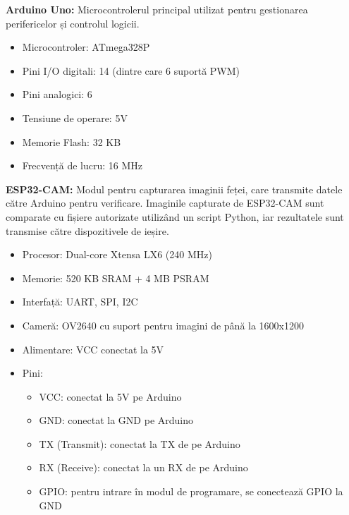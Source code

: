 \documentclass[a4paper,12pt]{report}
\begin{document}
\textbf{Arduino Uno:} Microcontrolerul principal utilizat pentru gestionarea perifericelor și controlul logicii.
\begin{itemize}
    \item Microcontroler: ATmega328P
    \item Pini I/O digitali: 14 (dintre care 6 suportă PWM)
    \item Pini analogici: 6
    \item Tensiune de operare: 5V
    \item Memorie Flash: 32 KB
    \item Frecvență de lucru: 16 MHz
\end{itemize}

\textbf{ESP32-CAM:} Modul pentru capturarea imaginii feței, care transmite datele către Arduino pentru verificare. Imaginile capturate de ESP32-CAM sunt comparate cu fișiere autorizate utilizând un script Python, iar rezultatele sunt transmise către dispozitivele de ieșire.
\begin{itemize}
    \item Procesor: Dual-core Xtensa LX6 (240 MHz)
    \item Memorie: 520 KB SRAM + 4 MB PSRAM
    \item Interfață: UART, SPI, I2C
    \item Cameră: OV2640 cu suport pentru imagini de până la 1600x1200
    \item Alimentare: VCC conectat la 5V
    \item Pini:
    \begin{itemize}
        \item VCC: conectat la 5V pe Arduino
        \item GND: conectat la GND pe Arduino
        \item TX (Transmit): conectat la TX de pe Arduino
        \item RX (Receive): conectat la un RX de pe Arduino
        \item GPIO: pentru intrare în modul de programare, se conectează GPIO la GND
    \end{itemize}
\end{itemize}
\end{document}
